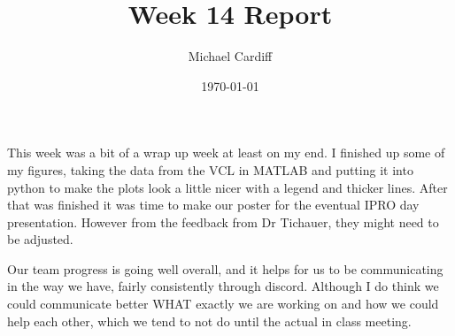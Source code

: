 \documentclass[12pt]{article}
\title{\vspace{-3em}Week 14 Report}
\author{Michael Cardiff}
\date{\today}
\begin{document}
\maketitle
This week was a bit of a wrap up week at least on my end. I finished up some of my figures, taking the data from the VCL in MATLAB and putting it into python to make the plots look a little nicer with a legend and thicker lines. After that was finished it was time to make our poster for the eventual IPRO day presentation. However from the feedback from Dr Tichauer, they might need to be adjusted.

Our team progress is going well overall, and it helps for us to be communicating in the way we have, fairly consistently through discord. Although I do think we could communicate better WHAT exactly we are working on and how we could help each other, which we tend to not do until the actual in class meeting. 
\end{document}
